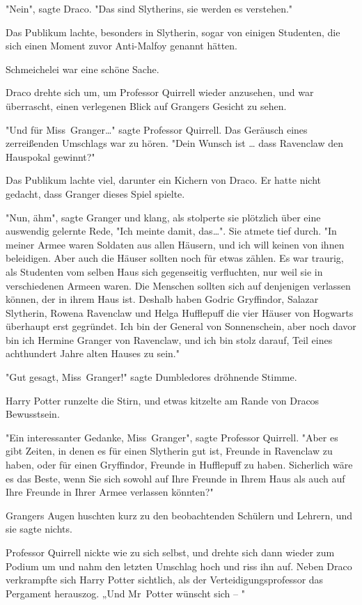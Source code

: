 {"Nein", sagte Draco. "Das sind Slytherins, sie werden es verstehen."

Das Publikum lachte, besonders in Slytherin, sogar von einigen Studenten, die sich einen Moment zuvor Anti-Malfoy genannt hätten.

Schmeichelei war eine schöne Sache.

Draco drehte sich um, um Professor Quirrell wieder anzusehen, und war überrascht, einen verlegenen Blick auf Grangers Gesicht zu sehen.

"Und für Miss~Granger…" sagte Professor Quirrell. Das Geräusch eines zerreißenden Umschlags war zu hören. "Dein Wunsch ist … dass Ravenclaw den Hauspokal gewinnt?"

Das Publikum lachte viel, darunter ein Kichern von Draco. Er hatte nicht gedacht, dass Granger dieses Spiel spielte.

"Nun, ähm", sagte Granger und klang, als stolperte sie plötzlich über eine auswendig gelernte Rede, "Ich meinte damit, das…". Sie atmete tief durch. "In meiner Armee waren Soldaten aus allen Häusern, und ich will keinen von ihnen beleidigen. Aber auch die Häuser sollten noch für etwas zählen. Es war traurig, als Studenten vom selben Haus sich gegenseitig verfluchten, nur weil sie in verschiedenen Armeen waren. Die Menschen sollten sich auf denjenigen verlassen können, der in ihrem Haus ist. Deshalb haben Godric Gryffindor, Salazar Slytherin, Rowena Ravenclaw und Helga Hufflepuff die vier Häuser von Hogwarts überhaupt erst gegründet. Ich bin der General von Sonnenschein, aber noch davor bin ich Hermine Granger von Ravenclaw, und ich bin stolz darauf, Teil eines achthundert Jahre alten Hauses zu sein."

"Gut gesagt, Miss~Granger!" sagte Dumbledores dröhnende Stimme.

Harry Potter runzelte die Stirn, und etwas kitzelte am Rande von Dracos Bewusstsein.

"Ein interessanter Gedanke, Miss~Granger", sagte Professor Quirrell. "Aber es gibt Zeiten, in denen es für einen Slytherin gut ist, Freunde in Ravenclaw zu haben, oder für einen Gryffindor, Freunde in Hufflepuff zu haben. Sicherlich wäre es das Beste, wenn Sie sich sowohl auf Ihre Freunde in Ihrem Haus als auch auf Ihre Freunde in Ihrer Armee verlassen könnten?"

Grangers Augen huschten kurz zu den beobachtenden Schülern und Lehrern, und sie sagte nichts.

Professor Quirrell nickte wie zu sich selbst, und drehte sich dann wieder zum Podium um und nahm den letzten Umschlag hoch und riss ihn auf. Neben Draco verkrampfte sich Harry Potter sichtlich, als der Verteidigungsprofessor das Pergament herauszog. „Und Mr~Potter wünscht sich -- "

}

